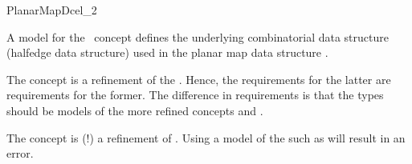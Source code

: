 
\ccRefPageBegin


\begin{ccRefConcept}{PlanarMapDcel_2}

   A model for the \ccRefName\ concept defines the underlying
   combinatorial data structure (halfedge data structure) used in the
   planar map data structure .


The
\lcTex{\ccc{\ccRefName}}\lcHtml{\ccRefName}
concept is a refinement of the . Hence, the requirements for the latter are requirements for the former. 
The difference in requirements is that the  
types should be models of the more refined concepts 
 and .

\ccTypes


   The concept  is  (!) a refinement
   of \ccRefName. Using a model of the  such as
    will result in an error.


\end{ccRefConcept} %
\ccRefPageEnd
